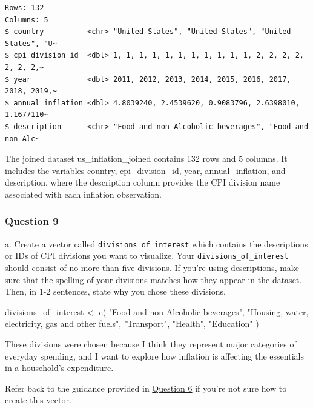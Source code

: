 \documentclass[
  letterpaper,
  DIV=11,
  numbers=noendperiod]{scrartcl}
\newenvironment{Shaded}{\begin{snugshade}}{\end{snugshade}}
\newcommand{\FunctionTok}[1]{\textcolor[rgb]{0.28,0.35,0.67}{#1}}
\newcommand{\NormalTok}[1]{\textcolor[rgb]{0.00,0.23,0.31}{#1}}
\newcommand{\OtherTok}[1]{\textcolor[rgb]{0.00,0.23,0.31}{#1}}
\newcommand{\StringTok}[1]{\textcolor[rgb]{0.13,0.47,0.30}{#1}}
\begin{document}
\begin{verbatim}
Rows: 132
Columns: 5
$ country          <chr> "United States", "United States", "United States", "U~
$ cpi_division_id  <dbl> 1, 1, 1, 1, 1, 1, 1, 1, 1, 1, 1, 2, 2, 2, 2, 2, 2, 2,~
$ year             <dbl> 2011, 2012, 2013, 2014, 2015, 2016, 2017, 2018, 2019,~
$ annual_inflation <dbl> 4.8039240, 2.4539620, 0.9083796, 2.6398010, 1.1677110~
$ description      <chr> "Food and non-Alcoholic beverages", "Food and non-Alc~
\end{verbatim}

The joined dataset us\_inflation\_joined contains 132 rows and 5
columns. It includes the variables country, cpi\_division\_id, year,
annual\_inflation, and description, where the description column
provides the CPI division name associated with each inflation
observation.

\subsubsection{Question 9}\label{question-9}

a. Create a vector called \texttt{divisions\_of\_interest} which
contains the descriptions or IDs of CPI divisions you want to visualize.
Your \texttt{divisions\_of\_interest} should consist of no more than
five divisions. If you're using descriptions, make sure that the
spelling of your divisions matches how they appear in the dataset. Then,
in 1-2 sentences, state why you chose these divisions.

\begin{Shaded}
\begin{Highlighting}[]
\NormalTok{divisions\_of\_interest }\OtherTok{\textless{}{-}} \FunctionTok{c}\NormalTok{(}
  \StringTok{"Food and non{-}Alcoholic beverages"}\NormalTok{,}
  \StringTok{"Housing, water, electricity, gas and other fuels"}\NormalTok{,}
  \StringTok{"Transport"}\NormalTok{,}
  \StringTok{"Health"}\NormalTok{,}
  \StringTok{"Education"}
\NormalTok{)}
\end{Highlighting}
\end{Shaded}

These divisions were chosen because I think they represent major
categories of everyday spending, and I want to explore how inflation is
affecting the essentials in a household's expenditure.

\begin{tcolorbox}[enhanced jigsaw, toptitle=1mm, bottomrule=.15mm, colbacktitle=quarto-callout-tip-color!10!white, colframe=quarto-callout-tip-color-frame, leftrule=.75mm, breakable, toprule=.15mm, colback=white, arc=.35mm, coltitle=black, left=2mm, opacitybacktitle=0.6, bottomtitle=1mm, opacityback=0, title=\textcolor{quarto-callout-tip-color}{\faLightbulb}\hspace{0.5em}{Tip}, titlerule=0mm, rightrule=.15mm]

Refer back to the guidance provided in \hyperref[question-6]{Question 6}
if you're not sure how to create this vector.

\end{tcolorbox}
\end{document}
